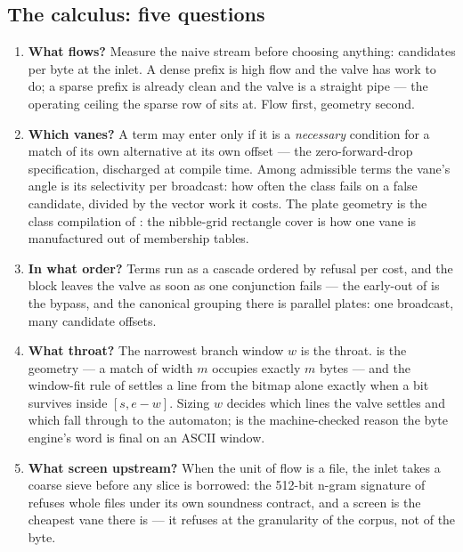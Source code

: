 \documentclass[11pt,letterpaper]{article}
\begin{document}
\subsection{The calculus: five questions}
\label{sec:calculus:questions}
\begin{enumerate}[leftmargin=*,itemsep=1pt,topsep=2pt]
\item \textbf{What flows?} Measure the naive stream before choosing
  anything: candidates per byte at the inlet. A dense prefix is high flow
  and the valve has work to do; a sparse prefix is already clean and the
  valve is a straight pipe --- the operating ceiling the sparse row of
   sits at. Flow first, geometry second.
\item \textbf{Which vanes?} A term may enter only if it is a
  \emph{necessary} condition for a match of its own alternative at its own
  offset --- the zero-forward-drop specification, discharged at compile
  time. Among admissible terms the vane's angle is its selectivity per
  broadcast: how often the class fails on a false candidate, divided by
  the vector work it costs. The plate geometry is the class compilation of
  : the nibble-grid rectangle cover is how one
  vane is manufactured out of membership tables.
\item \textbf{In what order?} Terms run as a cascade ordered by refusal
  per cost, and the block leaves the valve as soon as one conjunction
  fails --- the early-out of  is the bypass, and the
  canonical grouping there is parallel plates: one broadcast, many
  candidate offsets.
\item \textbf{What throat?} The narrowest branch window $w$ is the
  throat.  is the geometry --- a match of width $m$
  occupies exactly $m$ bytes --- and the window-fit rule of
   settles a line from the bitmap alone exactly
  when a bit survives inside $[s,e-w]$. Sizing $w$ decides which lines the
  valve settles and which fall through to the automaton;
   is the machine-checked reason the byte engine's word
  is final on an ASCII window.
\item \textbf{What screen upstream?} When the unit of flow is a file, the
  inlet takes a coarse sieve before any slice is borrowed: the 512-bit
  n-gram signature of  refuses whole files under its own
  soundness contract, and a screen is the cheapest vane there is --- it
  refuses at the granularity of the corpus, not of the byte.
\end{enumerate}
\end{document}
